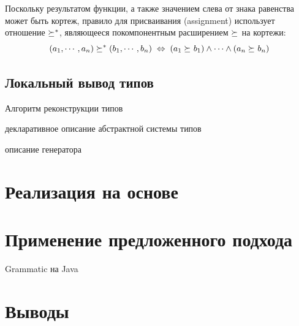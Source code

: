Поскольку результатом функции, а также значением слева от знака равенства может быть кортеж, правило для присваивания (assignment) использует отношение $\succeq_{}^*$, являющееся покомпонентным расширением $\succeq_{}$ на кортежи:
$$(a_1,\cdots,a_n)\succeq_{}^*(b_1,\cdots,b_n)
	\;\Leftrightarrow\; 
(a_1 \succeq_{} b_1) \wedge \cdots \wedge (a_n \succeq_{} b_n)$$

\section{Локальный вывод типов}
Алгоритм реконструкции типов

декларативное описание абстрактной системы типов

описание генератора

\chapter{Реализация на основе \GRM{}}

\chapter{Применение предложенного подхода}

Grammatic на Java

\chapter{Выводы}
